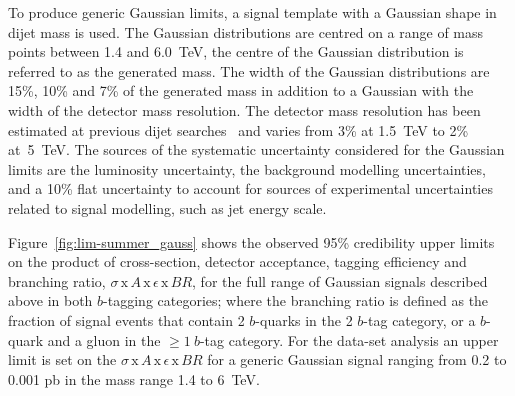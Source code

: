 \newpage 
To produce generic Gaussian limits,
a signal template with a Gaussian shape in dijet mass is used.
The Gaussian distributions are centred on a range of mass points between 1.4 and 6.0~TeV,
the centre of the  Gaussian distribution is referred to as the generated mass.
The width of the Gaussian distributions are
15\%, 10\% and 7\% of the generated mass
in addition to a Gaussian with the width of the detector mass resolution.
The detector mass resolution has been estimated
at previous dijet searches~\cite{dijet-mori16_paper}
and varies from 3\% at 1.5~TeV to 2\% at~5~TeV.
The sources of the systematic uncertainty considered for the Gaussian limits 
are the luminosity uncertainty,
the background modelling uncertainties,
and a 10\% flat uncertainty to account for sources of
experimental uncertainties related to signal modelling,
such as jet energy scale.

Figure~\ref{fig:lim-summer_gauss} shows the observed 95\% credibility upper limits
on the product of cross-section, detector acceptance, tagging efficiency and branching ratio,
$\sigma\,\text{x}\,\mathit{A}\,\text{x}\,\epsilon\,\text{x}\,\mathit{BR}$,
for the full range of Gaussian signals described above in both $b$-tagging categories;
where the branching ratio is defined as the fraction of signal events that contain 2 $b$-quarks in the 2 $b$-tag category,
or a $b$-quark and a gluon in the $\geq1~b$-tag category.
For the \summer{} data-set analysis an upper limit is set on the $\sigma\,\text{x}\,\mathit{A}\,\text{x}\,\epsilon\,\text{x}\,\mathit{BR}$
for a generic Gaussian signal ranging from 0.2 to 0.001 pb in the mass range 1.4 to 6~TeV.

